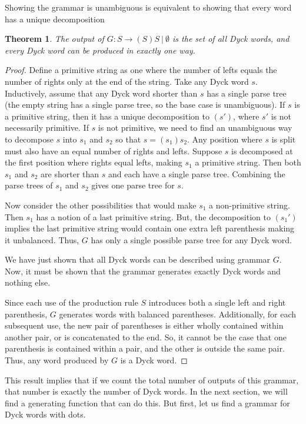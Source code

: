 \documentclass[11pt]{amsart}
\theoremstyle{plain}%
\newtheorem{thm}{Theorem}[section]
\theoremstyle{definition}
\theoremstyle{remark}
\numberwithin{equation}{thm}
\begin{document}
Showing the grammar is unambiguous is equivalent to showing that every word has a unique decomposition

\begin{thm}
\label{GUnambiguous}
The output of $G: S \rightarrow (S)S\ |\ \emptyset$ is the set of all Dyck words, and every Dyck word can be produced in exactly one way.
\end{thm}

\begin{proof}
Define a primitive string as one where the number of lefts equals the number of rights only at the end of the string. Take any Dyck word $s$. Inductively, assume that any Dyck word shorter than $s$ has a single parse tree (the empty string has a single parse tree, so the base case is unambiguous). If $s$ is a primitive string, then it has a unique decomposition to $(s')$, where $s'$ is not necessarily primitive. If $s$ is not primitive, we need to find an unambiguous way to decompose $s$ into $s_1$ and $s_2$ so that $s = (s_1)s_2$. Any position where $s$ is split must also have an equal number of rights and lefts. Suppose $s$ is decomposed at the first position where rights equal lefts, making $s_1$ a primitive string. Then both $s_1$ and $s_2$ are shorter than $s$ and each have a single parse tree. Combining the parse trees of $s_1$ and $s_2$ gives one parse tree for $s$.

Now consider the other possibilities that would make $s_1$ a non-primitive string. Then $s_1$ has a notion of a last primitive string. But, the decomposition to $(s_1')$ implies the last primitive string would contain one extra left parenthesis making it unbalanced. Thus, $G$ has only a single possible parse tree for any Dyck word.

We have just shown that all Dyck words can be described using grammar $G$. Now, it must be shown that the grammar generates exactly Dyck words and nothing else. 

Since each use of the production rule $S$ introduces both a single left and right parenthesis, $G$ generates words with balanced parentheses. Additionally, for each subsequent use, the new pair of parentheses is either wholly contained within another pair, or is concatenated to the end. So, it cannot be the case that one parenthesis is contained within a pair, and the other is outside the same pair. Thus, any word produced by $G$ is a Dyck word.
\end{proof}

This result implies that if we count the total number of outputs of this grammar, that number is exactly the number of Dyck words. In the next section, we will find a generating function that can do this. But first, let us find a grammar for Dyck words with dots.
\end{document}
